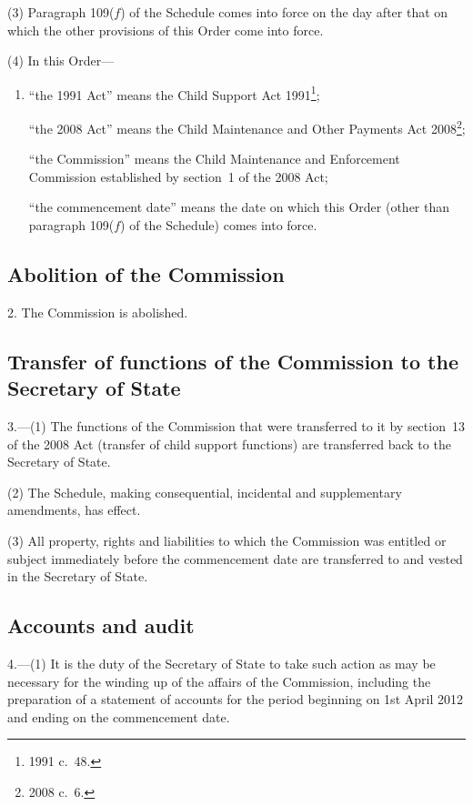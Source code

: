 \documentclass[12pt,a4paper]{article}
\begin{document}
(3) Paragraph 109($f$)  of the Schedule comes into force on the day after that on which the other provisions of this Order come into force.

(4) In this Order—
\begin{enumerate}\item[]
“the 1991 Act” means the Child Support Act 1991\footnote{1991 c.~48.};

“the 2008 Act” means the Child Maintenance and Other Payments Act 2008\footnote{2008 c.~6.};

“the Commission” means the Child Maintenance and Enforcement Commission established by section~1 of the 2008 Act;

“the commencement date” means the date on which this Order (other than paragraph 109($f$)  of the Schedule) comes into force.
\end{enumerate}

\subsection[2. Abolition of the Commission]{Abolition of the Commission}

2.  The Commission is abolished.

\subsection[3. Transfer of functions of the Commission to the Secretary of State]{Transfer of functions of the Commission to the Secretary of State}

3.---(1)  The functions of the Commission that were transferred to it by section~13 of the 2008 Act (transfer of child support functions) are transferred back to the Secretary of State.

(2) The Schedule, making consequential, incidental and supplementary amendments, has effect.

(3) All property, rights and liabilities to which the Commission was entitled or subject immediately before the commencement date are transferred to and vested in the Secretary of State.

\subsection[4. Accounts and audit]{Accounts and audit}

4.---(1)  It is the duty of the Secretary of State to take such action as may be necessary for the winding up of the affairs of the Commission, including the preparation of a statement of accounts for the period beginning on 1st April 2012 and ending on the commencement date.
\end{document}
